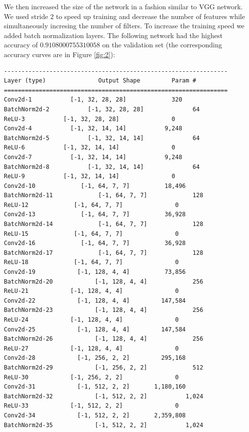 \documentclass [a4paper, 11pt] {article}
\begin{document}
\begin{enumerate}
We then increased the size of the network in a fashion similar to VGG network. We used stride 2 to speed up training and decrease the number of features while simultaneously incresing the number of filters. To increase the training speed we added batch normalization layers. The following network had the highest accuracy of $0.9108000755310058$ on the validation set (the corresponding accuracy curves are in Figure \ref{fig:2}):

\begin{lstlisting}
----------------------------------------------------------------
Layer (type)               Output Shape         Param #
================================================================
Conv2d-1           [-1, 32, 28, 28]             320
BatchNorm2d-2           [-1, 32, 28, 28]              64
ReLU-3           [-1, 32, 28, 28]               0
Conv2d-4           [-1, 32, 14, 14]           9,248
BatchNorm2d-5           [-1, 32, 14, 14]              64
ReLU-6           [-1, 32, 14, 14]               0
Conv2d-7           [-1, 32, 14, 14]           9,248
BatchNorm2d-8           [-1, 32, 14, 14]              64
ReLU-9           [-1, 32, 14, 14]               0
Conv2d-10             [-1, 64, 7, 7]          18,496
BatchNorm2d-11             [-1, 64, 7, 7]             128
ReLU-12             [-1, 64, 7, 7]               0
Conv2d-13             [-1, 64, 7, 7]          36,928
BatchNorm2d-14             [-1, 64, 7, 7]             128
ReLU-15             [-1, 64, 7, 7]               0
Conv2d-16             [-1, 64, 7, 7]          36,928
BatchNorm2d-17             [-1, 64, 7, 7]             128
ReLU-18             [-1, 64, 7, 7]               0
Conv2d-19            [-1, 128, 4, 4]          73,856
BatchNorm2d-20            [-1, 128, 4, 4]             256
ReLU-21            [-1, 128, 4, 4]               0
Conv2d-22            [-1, 128, 4, 4]         147,584
BatchNorm2d-23            [-1, 128, 4, 4]             256
ReLU-24            [-1, 128, 4, 4]               0
Conv2d-25            [-1, 128, 4, 4]         147,584
BatchNorm2d-26            [-1, 128, 4, 4]             256
ReLU-27            [-1, 128, 4, 4]               0
Conv2d-28            [-1, 256, 2, 2]         295,168
BatchNorm2d-29            [-1, 256, 2, 2]             512
ReLU-30            [-1, 256, 2, 2]               0
Conv2d-31            [-1, 512, 2, 2]       1,180,160
BatchNorm2d-32            [-1, 512, 2, 2]           1,024
ReLU-33            [-1, 512, 2, 2]               0
Conv2d-34            [-1, 512, 2, 2]       2,359,808
BatchNorm2d-35            [-1, 512, 2, 2]           1,024

\end{lstlisting}
\end{enumerate}
\end{document}

